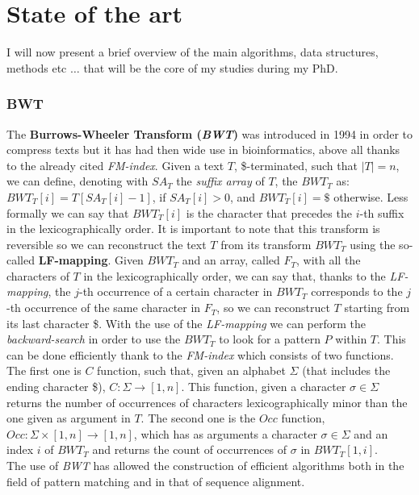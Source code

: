 \documentclass[a4paper,11pt, oneside]{article}
\begin{document}
\section*{State of the art}
I will now present a brief overview of the main algorithms, data structures,
methods etc $\ldots$ that will be the core of my studies during my PhD. 
\subsubsection*{BWT}
The \textbf{Burrows-Wheeler Transform (\textit{BWT})} was introduced
in 1994 in order to compress texts but it has had then wide use in
bioinformatics, above all thanks to the already cited \textit{FM-index}. Given a
text $T$, \$-terminated, such that $|T|=n$, we can define, denoting
with $SA_T$ the \textit{suffix array} of $T$, the $BWT_T$ as:
$BWT_T[i] = T[SA_T[i]-1]$, if $SA_T[i]>0$, and $BWT_T[i] = \$ $ otherwise. Less
formally we can say that $BWT_T[i]$ is the character that precedes the $i$-th
suffix in the lexicographically order. It is important to note that this
transform is reversible so we can reconstruct the text $T$ from its transform
$BWT_T$ using the so-called \textbf{LF-mapping}. Given $BWT_T$ and an array,
called $F_T$, with all the characters of $T$ in the lexicographically order, we
can say that, thanks to the \textit{LF-mapping}, the $j$-th occurrence of a
certain character in $BWT_T$ corresponds to the $j$-th occurrence of the same
character in $F_T$, so we can reconstruct $T$ starting from its last character
\$. With the use of the \textit{LF-mapping} we can perform the
\textit{backward-search} in order to use the $BWT_T$ to look for a pattern $P$
within $T$. This can be done efficiently thank to the \textit{FM-index} which
consists of two functions. The first one is $C$ function, such that, given an
alphabet $\Sigma$ (that includes the ending character \$),
$C:\Sigma\to[1,n]$. This function, given a character $\sigma\in \Sigma$ returns
the number of occurrences of characters lexicographically minor than the one
given as argument in $T$. The second one is the $Occ$ function,
$Occ:\Sigma\times[1,n]\to[1,n]$, which has as arguments a character
$\sigma\in\Sigma$ 
and an index $i$ of $BWT_T$ and returns the count of occurrences of $\sigma$ in
$BWT_T[1,i]$.\\
The use of \textit{BWT} has allowed the construction of efficient algorithms
both in the field of pattern matching and in that of sequence alignment. 
\end{document}
